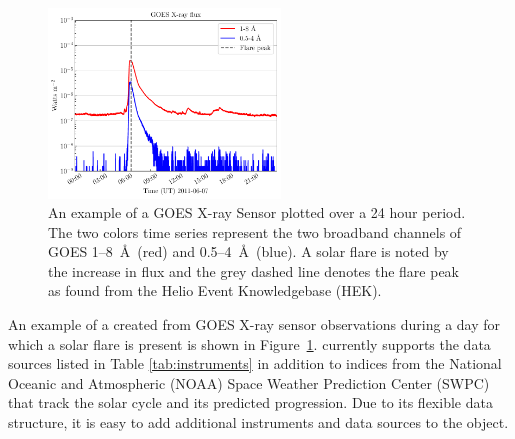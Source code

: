 \begin{figure}
    \centering
    \includegraphics[width=0.55\textwidth]{figures/timeseries_example.pdf}
    \caption{An example of a GOES X-ray Sensor \Timeseries plotted over a 24 hour period. The two colors time series represent the two broadband channels of GOES 1--8~\AA\ (red) and 0.5--4~\AA\ (blue).  A solar flare is noted by the increase in flux and the grey dashed line denotes the flare peak as found from the Helio Event Knowledgebase (HEK).}
    \label{fig:timeseries_example}
\end{figure}

An example of a \Timeseries created from GOES X-ray sensor observations during a day for which a solar flare is present is shown in Figure~\ref{fig:timeseries_example}.
\Timeseries currently supports the data sources listed in Table \ref{tab:instruments} in addition to indices from the National Oceanic and Atmospheric (NOAA) Space Weather Prediction Center (SWPC) that track the solar cycle and its predicted progression. Due to its flexible data structure, it is easy to add additional instruments and data sources to the \Timeseries object.

